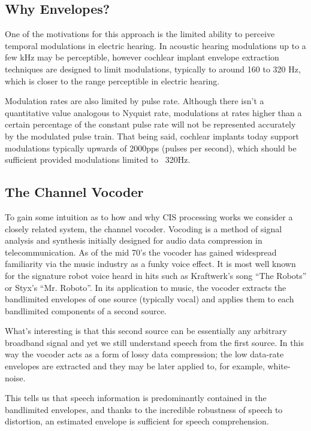 \documentclass [11pt, proquest] {uwthesis}[2015/03/03]
\begin{document}

\subsection{Why Envelopes?}

One of the motivations for this approach is the limited ability to perceive temporal modulations in electric hearing.  In acoustic hearing modulations up to a few kHz may be perceptible, however cochlear implant envelope extraction techniques are designed to limit modulations, typically to around 160 to 320 Hz, which is closer to the range perceptible in electric hearing.

Modulation rates are also limited by pulse rate.  Although there isn't a quantitative value analogous to Nyquist rate, modulations at rates higher than a certain percentage of the constant pulse rate will not be represented accurately by the modulated pulse train.  That being said, cochlear implants today support modulations typically upwards of 2000pps (pulses per second), which should be sufficient provided modulations limited to ~320Hz.

\subsection{The Channel Vocoder}

To gain some intuition as to how and why CIS processing works we consider a closely related system, the channel vocoder.  Vocoding is a method of signal analysis and synthesis initially designed for audio data compression in telecommunication.  As of the mid 70's the vocoder has gained widespread familiarity via the music industry as a funky voice effect.  It is most well known for the signature robot voice heard in hits such as Kraftwerk's song ``The Robots'' or Styx's ``Mr. Roboto''.  In its application to music, the vocoder extracts the bandlimited envelopes of one source (typically vocal) and applies them to each bandlimited components of a second source.

What's interesting is that this second source can be essentially any arbitrary broadband signal and yet we still understand speech from the first source.  In this way the vocoder acts as a form of lossy data compression; the low data-rate envelopes are extracted and they may be later applied to, for example, white-noise.

This tells us that speech information is predominantly contained in the bandlimited envelopes, and thanks to the incredible robustness of speech to distortion, an estimated envelope is sufficient for speech comprehension.
\end{document}
